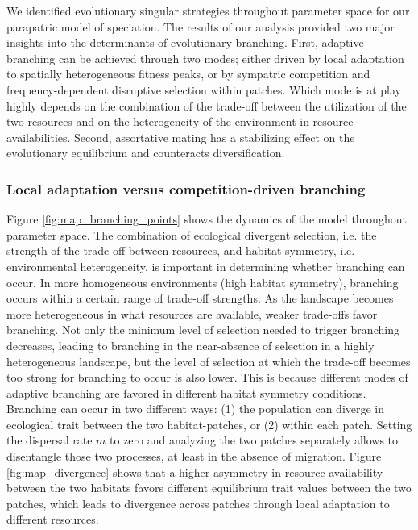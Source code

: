 We identified evolutionary singular strategies throughout parameter space for our parapatric model of speciation. The results of our analysis provided two major insights into the determinants of evolutionary branching. First, adaptive branching can be achieved through two modes; either driven by local adaptation to spatially heterogeneous fitness peaks, or by sympatric competition and frequency-dependent disruptive selection within patches. Which mode is at play highly depends on the combination of the trade-off between the utilization of the two resources and on the heterogeneity of the environment in resource availabilities. Second, assortative mating has a stabilizing effect on the evolutionary equilibrium and counteracts diversification.

\subsubsection*{Local adaptation versus competition-driven branching}

Figure \ref{fig:map_branching_points} shows the dynamics of the model throughout parameter space. The combination of ecological divergent selection, i.e. the strength of the trade-off between resources, and habitat symmetry, i.e. environmental heterogeneity, is important in determining whether branching can occur. In more homogeneous environments (high habitat symmetry), branching occurs within a certain range of trade-off strengths. As the landscape becomes more heterogeneous in what resources are available, weaker trade-offs favor branching. Not only the minimum level of selection needed to trigger branching decreases, leading to branching in the near-absence of selection in a highly heterogeneous landscape, but the level of selection at which the trade-off becomes too strong for branching to occur is also lower. This is because different modes of adaptive branching are favored in different habitat symmetry conditions.\\

Branching can occur in two different ways: (1) the population can diverge in ecological trait between the two habitat-patches, or (2) within each patch. Setting the dispersal rate $m$ to zero and analyzing the two patches separately allows to disentangle those two processes, at least in the absence of migration. Figure \ref{fig:map_divergence} shows that a higher asymmetry in resource availability between the two habitats favors different equilibrium trait values between the two patches, which leads to divergence across patches through local adaptation to different resources.\\

